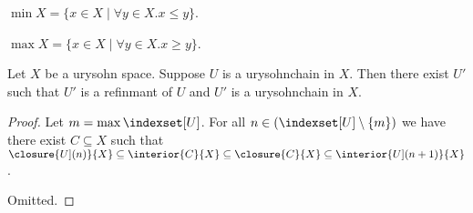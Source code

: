 \begin{definition}\label{minimum}
    $\min{X} = \{x \in X \mid \forall y \in X. x \leq y \}$.
\end{definition}

\begin{definition}\label{maximum}
    $\max{X} = \{x \in X \mid \forall y \in X. x \geq y \}$.
\end{definition}

\begin{proposition}\label{urysohnchain_induction_step_existence}
    Let $X$ be a urysohn space.
    Suppose $U$ is a urysohnchain in $X$.
    Then there exist $U'$ such that $U'$ is a refinmant of $U$ and $U'$ is a urysohnchain in $X$.
\end{proposition}
\begin{proof}

    Let $m = \max{\indexset[U]}$.
    For all $n \in (\indexset[U] \setminus \{m\})$ we have there exist $C \subseteq X$ 
    such that $\closure{\index[U](n)}{X} \subseteq \interior{C}{X} \subseteq \closure{C}{X} \subseteq \interior{\index[U](n+1)}{X}$.
    
    
    Omitted.

\end{proof}










